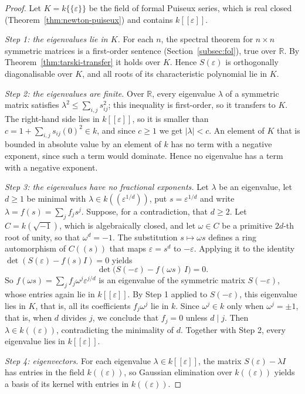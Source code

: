 \documentclass[12pt, a4paper]{report}
\theoremstyle{plain}
\theoremstyle{definition}
\theoremstyle{remark}
\theoremstyle{plain}
\newcommand{\RR}{\mathbb{R}}
\begin{document}
\begin{proof}
Let $K=k\{\{\varepsilon\}\}$ be the field of formal Puiseux series, which is real closed (Theorem~\ref{thm:newton-puiseux}) and contains $k[[\varepsilon]]$.

\emph{Step 1: the eigenvalues lie in $K$.} For each $n$, the spectral theorem for $n\times n$ symmetric matrices is a first-order sentence (Section~\ref{subsec:fol}), true over $\RR$. By Theorem~\ref{thm:tarski-transfer} it holds over $K$. Hence $S(\varepsilon)$ is orthogonally diagonalisable over $K$, and all roots of its characteristic polynomial lie in $K$.

\emph{Step 2: the eigenvalues are finite.} Over $\RR$, every eigenvalue $\lambda$ of a symmetric matrix satisfies $\lambda^2\leq\sum_{i,j}s_{ij}^2$; this inequality is first-order, so it transfers to $K$. The right-hand side lies in $k[[\varepsilon]]$, so it is smaller than $c=1+\sum_{i,j}s_{ij}(0)^2\in k$, and since $c\geq1$ we get $|\lambda|<c$. An element of $K$ that is bounded in absolute value by an element of $k$ has no term with a negative exponent, since such a term would dominate. Hence no eigenvalue has a term with a negative exponent.

\emph{Step 3: the eigenvalues have no fractional exponents.} Let $\lambda$ be an eigenvalue, let $d\geq1$ be minimal with $\lambda\in k((\varepsilon^{1/d}))$, put $s=\varepsilon^{1/d}$ and write $\lambda=f(s)=\sum_jf_js^j$. Suppose, for a contradiction, that $d\geq2$. Let $C=k(\sqrt{-1})$, which is algebraically closed, and let $\omega\in C$ be a primitive $2d$-th root of unity, so that $\omega^d=-1$. The substitution $s\mapsto\omega s$ defines a ring automorphism of $C((s))$ that maps $\varepsilon=s^d$ to $-\varepsilon$. Applying it to the identity $\det(S(\varepsilon)-f(s)I)=0$ yields
\[ \det\bigl(S(-\varepsilon)-f(\omega s)\,I\bigr)=0 . \]
So $f(\omega s)=\sum_jf_j\omega^j\varepsilon^{j/d}$ is an eigenvalue of the symmetric matrix $S(-\varepsilon)$, whose entries again lie in $k[[\varepsilon]]$. By Step 1 applied to $S(-\varepsilon)$, this eigenvalue lies in $K$, that is, all its coefficients $f_j\omega^j$ lie in $k$. Since $\omega^j\in k$ only when $\omega^j=\pm1$, that is, when $d$ divides $j$, we conclude that $f_j=0$ unless $d\mid j$. Then $\lambda\in k((\varepsilon))$, contradicting the minimality of $d$. Together with Step 2, every eigenvalue lies in $k[[\varepsilon]]$.

\emph{Step 4: eigenvectors.} For each eigenvalue $\lambda\in k[[\varepsilon]]$, the matrix $S(\varepsilon)-\lambda I$ has entries in the field $k((\varepsilon))$, so Gaussian elimination over $k((\varepsilon))$ yields a basis of its kernel with entries in $k((\varepsilon))$.


\end{proof}
\end{document}
